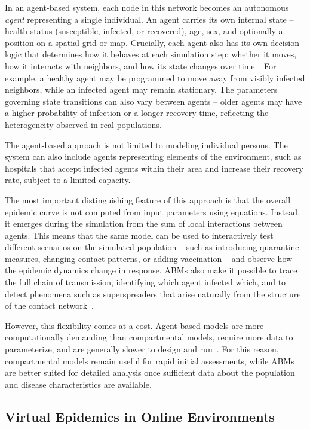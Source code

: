 \documentclass[english]{projectreport}
\begin{document}
In an agent-based system, each node in this network becomes an autonomous
\emph{agent} representing a single individual. An agent carries its own
internal state -- health status (susceptible, infected, or recovered),
age, sex, and optionally a position on a spatial grid or map. Crucially,
each agent also has its own decision logic that determines how it behaves
at each simulation step: whether it moves, how it interacts with
neighbors, and how its state changes over time~\cite{cdc2025transmission}.
For example, a healthy agent may be programmed to move away from visibly
infected neighbors, while an infected agent may remain stationary. The
parameters governing state transitions can also vary between agents --
older agents may have a higher probability of infection or a longer
recovery time, reflecting the heterogeneity observed in real populations.

The agent-based approach is not limited to modeling individual persons.
The system can also include agents representing elements of the
environment, such as hospitals that accept infected agents within their
area and increase their recovery rate, subject to a limited capacity.

The most important distinguishing feature of this approach is that the
overall epidemic curve is not computed from input parameters using
equations. Instead, it emerges during the simulation from the sum of
local interactions between agents. This means that the same model can be
used to interactively test different scenarios on the simulated
population -- such as introducing quarantine measures, changing contact
patterns, or adding vaccination -- and observe how the epidemic dynamics
change in response. ABMs also make it possible to trace the full chain
of transmission, identifying which agent infected which, and to detect
phenomena such as superspreaders that arise naturally from the structure
of the contact network~\cite{cdc2025transmission}.

However, this flexibility comes at a cost. Agent-based models are more
computationally demanding than compartmental models, require more data to
parameterize, and are generally slower to design and
run~\cite{cdc2025transmission}. For this reason, compartmental models
remain useful for rapid initial assessments, while ABMs are better suited
for detailed analysis once sufficient data about the population and
disease characteristics are available.
\subsection{Virtual Epidemics in Online Environments}
\label{sec:wow-epidemic}
\end{document}
